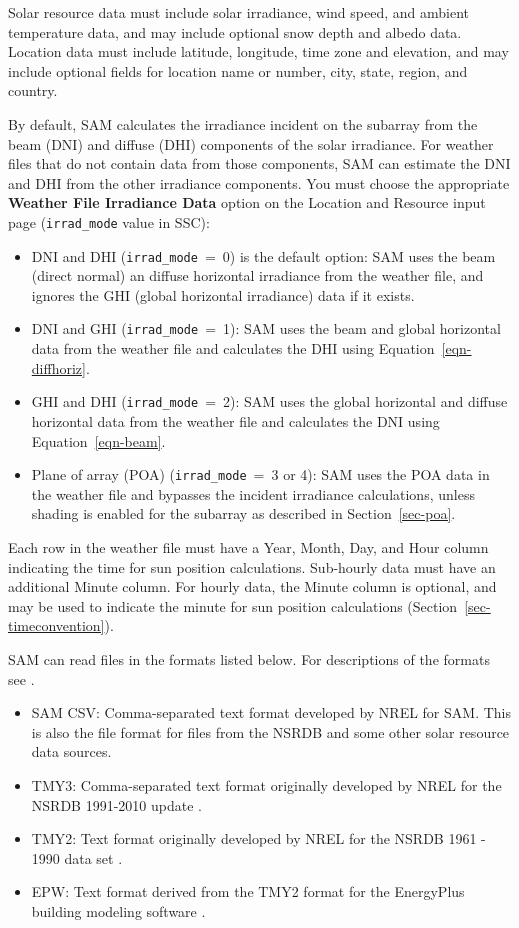 \documentclass[12pt,letterpaper]{article}
\begin{document}
Solar resource data must include solar irradiance, wind speed, and ambient temperature data, and may include optional snow depth and albedo data. Location data must include latitude, longitude, time zone and elevation, and may include optional fields for location name or number, city, state, region, and country. 

By default, SAM calculates the irradiance incident on the subarray from the beam (DNI) and diffuse (DHI) components of the solar irradiance. For weather files that do not contain data from those components, SAM can estimate the DNI and DHI from the other irradiance components. You must choose the appropriate \textbf{Weather File Irradiance Data} option on the Location and Resource input page (\texttt{irrad\_mode} value in SSC):

\begin{itemize} 
\item DNI and DHI (\texttt{irrad\_mode}~=~0) is the default option: SAM uses the beam (direct normal) an diffuse horizontal irradiance from the weather file, and ignores the GHI (global horizontal irradiance) data if it exists.
\item DNI and GHI (\texttt{irrad\_mode}~=~1): SAM uses the beam and global horizontal data from the weather file and calculates the DHI using Equation~\ref{eqn-diffhoriz}.
\item GHI and DHI (\texttt{irrad\_mode}~=~2): SAM uses the global horizontal and diffuse horizontal data from the weather file and calculates the DNI using Equation~\ref{eqn-beam}.
\item Plane of array (POA) (\texttt{irrad\_mode}~=~3 or 4): SAM uses the POA data in the weather file and bypasses the incident irradiance calculations, unless shading is enabled for the subarray as described in  Section~\ref{sec-poa}.
\end{itemize}

Each row in the weather file must have a Year, Month, Day, and Hour column indicating the time for sun position calculations. Sub-hourly data must have an additional Minute column. For hourly data, the Minute column is optional, and may be used to indicate the minute for sun position calculations (Section~\ref{sec-timeconvention}). 

SAM can read files in the formats listed below. For descriptions of the formats see \citep{help-weatherfileformats}.

\begin{itemize}
\item SAM CSV: Comma-separated text format developed by NREL for SAM. This is also the file format for files from the NSRDB \citep{nsrdb} and some other solar resource data sources.
\item TMY3: Comma-separated text format originally developed by NREL for the NSRDB 1991-2010 update \citep{nsrdb-old}.
\item TMY2: Text format originally developed by NREL for the NSRDB 1961 - 1990 data set \citep{nsrdb-old}.
\item EPW: Text format derived from the TMY2 format for the EnergyPlus building modeling software \citep{epw}. 
\end{itemize}
\end{document}
